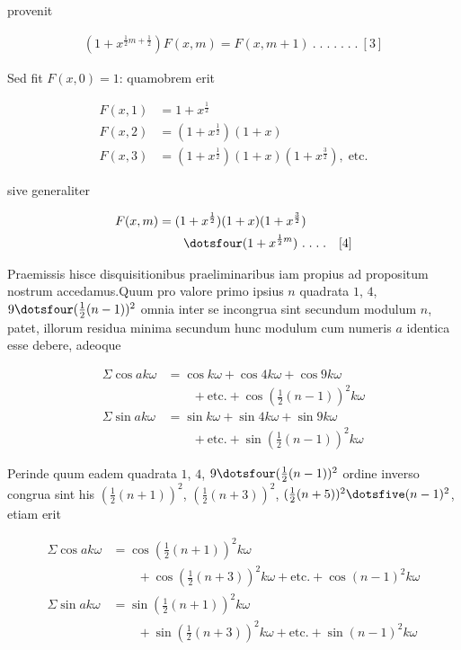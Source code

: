 provenit

\[
\begin{aligned}
(1+x^{\frac12m+\frac12})F(x,m)=F(x,m+1)\ .\; .\; .\; .\; .\; .\; .\ [3]
\end{aligned}
\]

Sed fit $F(x,0)=1$: quamobrem erit

\[
\begin{aligned}
F(x,1)&=1+x^{\frac12}\\
F(x,2)&=(1+x^{\frac12})(1+x)\\
F(x,3)&=(1+x^{\frac12})(1+x)(1+x^{\frac32}),\;\text{etc.}
\end{aligned}
\]

sive generaliter

\[
\begin{aligned}
F(x,m)&=(1+x^{\frac12})(1+x)(1+x^{\frac32})\\&\qquad\dotsfour(1+x^{\frac12m})\ .\; .\; .\; .\quad[4]
\end{aligned}
\]


Praemissis hisce disquisitionibus praeliminaribus iam propius ad propositum nostrum accedamus.\quad Quum pro valore primo ipsius $n$ quadrata $1$, $4$, $9\dotsfour(\frac12(n-1))^2$ omnia inter se incongrua sint secundum modulum $n$, patet, illorum residua minima secundum hunc modulum cum numeris $a$ identica esse debere, adeoque

\[
\begin{aligned}
\Sigma\cos ak\omega&=\cos k\omega+\cos4k\omega+\cos9k\omega\\&\qquad+\text{etc.}+\cos(\tfrac12(n-1))^2k\omega\\
\Sigma\sin ak\omega&=\sin k\omega+\sin4k\omega+\sin9k\omega\\&\qquad+\text{etc.}+\sin(\tfrac12(n-1))^2k\omega
\end{aligned}
\]

Perinde quum eadem quadrata $1$, $4$, $9\dotsfour(\frac12(n-1))^2$ ordine inverso congrua sint his $(\frac12(n+1))^2$, $(\frac12(n+3))^2$, $(\frac12(n+5))^2\dotsfive(n-1)^2$, etiam erit


\[
\begin{aligned}
\Sigma\cos ak\omega&=\cos(\tfrac12(n+1))^2k\omega\\&\qquad+\cos(\tfrac12(n+3))^2k\omega+\text{etc.}+\cos(n-1)^2k\omega\\
\Sigma\sin ak\omega&=\sin(\tfrac12(n+1))^2k\omega\\&\qquad+\sin(\tfrac12(n+3))^2k\omega+\text{etc.}+\sin(n-1)^2k\omega
\end{aligned}
\]

